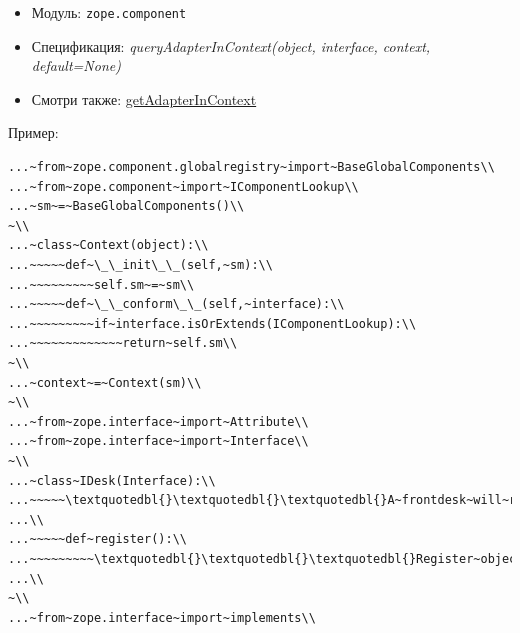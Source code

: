 \documentclass[a4paper,openany,twoside,draft]{book}
\providecommand*{\DUroletitlereference}[1]{\textsl{#1}}
\begin{document}
\begin{itemize}

\item Модуль: \texttt{zope.component}

\item Спецификация: \DUroletitlereference{queryAdapterInContext(object, interface, context,
default=None)}

\item Смотри также: \hyperref[getadapterincontext]{getAdapterInContext}

\end{itemize}

Пример:

\begin{verbatim}
...~from~zope.component.globalregistry~import~BaseGlobalComponents\\
...~from~zope.component~import~IComponentLookup\\
...~sm~=~BaseGlobalComponents()\\
~\\
...~class~Context(object):\\
...~~~~~def~\_\_init\_\_(self,~sm):\\
...~~~~~~~~~self.sm~=~sm\\
...~~~~~def~\_\_conform\_\_(self,~interface):\\
...~~~~~~~~~if~interface.isOrExtends(IComponentLookup):\\
...~~~~~~~~~~~~~return~self.sm\\
~\\
...~context~=~Context(sm)\\
~\\
...~from~zope.interface~import~Attribute\\
...~from~zope.interface~import~Interface\\
~\\
...~class~IDesk(Interface):\\
...~~~~~\textquotedbl{}\textquotedbl{}\textquotedbl{}A~frontdesk~will~register~object's~details\textquotedbl{}\textquotedbl{}\textquotedbl{}\\
...\\
...~~~~~def~register():\\
...~~~~~~~~~\textquotedbl{}\textquotedbl{}\textquotedbl{}Register~object's~details\textquotedbl{}\textquotedbl{}\textquotedbl{}\\
...\\
~\\
...~from~zope.interface~import~implements\\

\end{verbatim}
\end{document}
